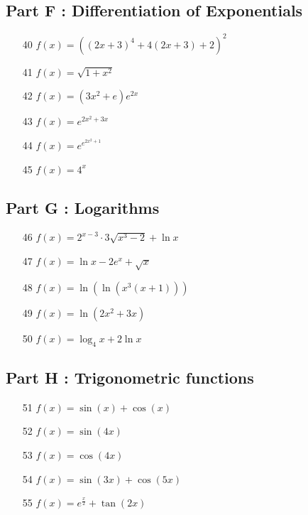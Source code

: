 \documentclass[]{article}
\begin{document}
\subsection*{Part F : Differentiation of Exponentials}
{
	\Large
	\begin{multicols}{2}
		\begin{itemize}
			
			\item[40] $ f(x) = ((2x+3)^4 + 4(2x+3) +2)^2 $ \,
			\item[41] $ f(x) = \sqrt{1+x^2} $ \,
			\item[42] $ f(x) = (3x^2+e)e^{2x}$ \,
			\item[43] $ f(x) = e^{2x^2+3x}$\,
			\item[44] $ f(x) = e^{e^{2x^2+1}}$\,
			\item[45] $ f(x) = 4^x$ \,
		\end{itemize}
	\end{multicols}
}
\subsection*{Part G : Logarithms}
{
	\Large
	\begin{multicols}{2}
		\begin{itemize}
			\item[46] $ f(x) = 2^{x-3}\cdot3\sqrt{x^3-2}+\ln x$ \,
			\item[47] $ f(x) = \ln x - 2e^x + \sqrt{x}$ \,
			\item[48] $ f(x) = \ln(\ln(x^3(x+1))) $ \,
			\item[49] $ f(x) = \ln(2x^2+3x)$ 
			\item[50] $ f(x) = \log_4 x + 2\ln x$ \,
		\end{itemize}
	\end{multicols}
}
\subsection*{Part H : Trigonometric functions}
{
	\Large
	\begin{multicols}{2}
		\begin{itemize}
			\item[51] $ f(x) = \sin(x)+\cos(x)$ \,
			\item[52] $ f(x) = \sin(4x)$
			\item[53] $ f(x) = \cos(4x)$
			\item[54] $ f(x) = \sin(3x)+\cos(5x)$ \,
			\item[55] $ f(x) = e^{\frac{x}{2}} + \tan(2x)$
 		\end{itemize}
	\end{multicols}
}
\end{document}
